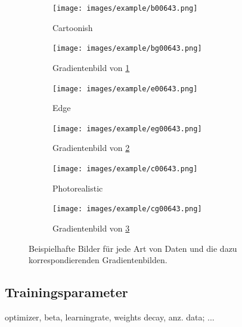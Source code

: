 \begin{figure}[htp]
\begin{subfigure}[b]{0.48\linewidth}
		\centering
		\texttt{[image: images/example/b00643.png]}
		\caption{Cartoonish}
		\label{subfig:cartoonish}
	\end{subfigure}
	\hfill
	\begin{subfigure}[b]{0.48\linewidth}
		\centering
		\texttt{[image: images/example/bg00643.png]}
		\caption{Gradientenbild von \ref{subfig:cartoonish}}
	\end{subfigure}
	\hfill
	\begin{subfigure}[b]{0.48\linewidth}
		\centering
		\texttt{[image: images/example/e00643.png]}
		\caption{Edge}
		\label{subfig:edge}
	\end{subfigure}
	\hfill
	\begin{subfigure}[b]{0.48\linewidth}
		\centering
		\texttt{[image: images/example/eg00643.png]}
		\caption{Gradientenbild von \ref{subfig:edge}}
	\end{subfigure}
	\hfill
	\begin{subfigure}[b]{0.48\linewidth}
		\centering
		\texttt{[image: images/example/c00643.png]}
		\caption{Photorealistic}
		\label{subfig:photorealistic}
	\end{subfigure}
	\hfill
	\begin{subfigure}[b]{0.48\linewidth}
		\centering
		\texttt{[image: images/example/cg00643.png]}
		\caption{Gradientenbild von \ref{subfig:photorealistic}}
	\end{subfigure}
	\caption{Beispielhafte Bilder für jede Art von Daten und die dazu korrespondierenden Gradientenbilden.}
	\label{fig:dataset_preprocess}
\end{figure}
\vspace{\fill}

\subsection{Trainingsparameter}
optimizer, beta,
learningrate,
weights decay, anz. data; ...